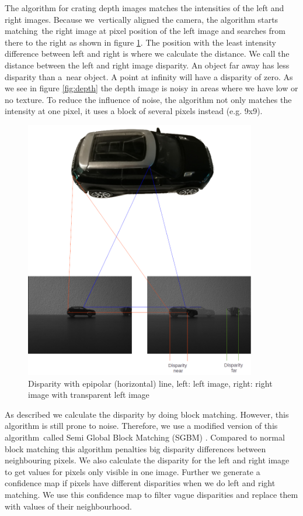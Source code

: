 \documentclass[11pt,a4paper,titlepage,oneside]{report}
\begin{document}
The algorithm for crating depth images matches the intensities of the left and right images. Because we vertically aligned the camera, the algorithm starts matching the right image at pixel position of the left image and searches from there to the right as shown in figure \ref{fig:disparity}. The position with the least intensity difference between left and right is where we calculate the distance. We call the distance between the left and right image disparity. An object far away has less disparity than a near object. A point at infinity will have a disparity of zero. As we see in figure \ref{fig:depth} the depth image is noisy in areas where we have low or no texture. To reduce the influence of noise, the algorithm not only matches the intensity at one pixel, it uses a block of several pixels instead (e.g. 9x9).
\begin{figure}[H]
  \begin{center}
		\includegraphics[width=0.9\textwidth]{img/disparity_concept.png}
  \end{center}
	\caption{Disparity with epipolar (horizontal) line, left: left image, right: right image with transparent left image}\label{fig:disparity}
\end{figure}

As described we calculate the disparity by doing block matching. However, this algorithm is still prone to noise. Therefore, we use a modified version of this algorithm called Semi Global Block Matching (SGBM) \cite{sgbm}. Compared to normal block matching this algorithm penalties big disparity differences between neighbouring pixels. We also calculate the disparity for the left and right image to get values for pixels only visible in one image. Further we generate a confidence map if pixels have different disparities when we do left and right matching. We use this confidence map to filter vague disparities and replace them with values of their neighbourhood.
\end{document}
